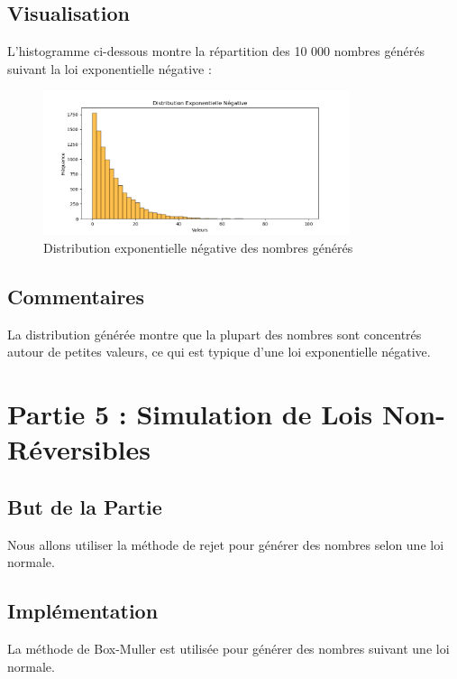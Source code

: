 \documentclass[a4paper,12pt]{report}
\begin{document}
\subsection*{Visualisation}
L'histogramme ci-dessous montre la répartition des 10 000 nombres générés suivant la loi exponentielle négative :

\begin{figure}[h!]
    \centering
    \includegraphics[width=0.8\textwidth]{2.png}
    \caption{Distribution exponentielle négative des nombres générés}
\end{figure}

\subsection*{Commentaires}
La distribution générée montre que la plupart des nombres sont concentrés autour de petites valeurs, ce qui est typique d'une loi exponentielle négative.

\newpage
\section*{Partie 5 : Simulation de Lois Non-Réversibles}

\subsection*{But de la Partie}
Nous allons utiliser la méthode de rejet pour générer des nombres selon une loi normale.

\subsection*{Implémentation}
La méthode de Box-Muller est utilisée pour générer des nombres suivant une loi normale.
\end{document}

